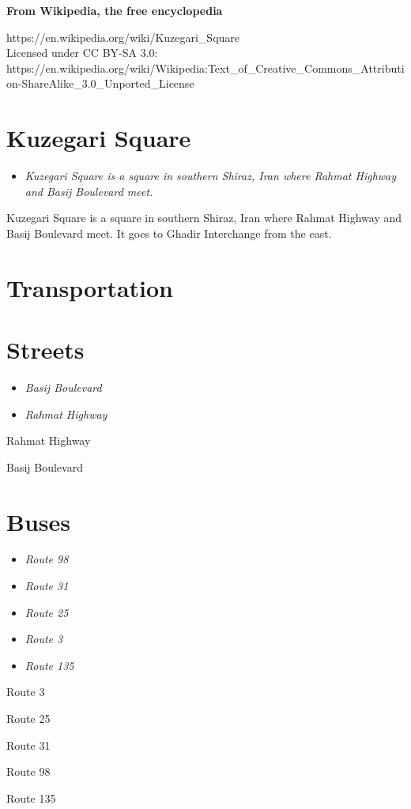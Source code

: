 \textbf{From Wikipedia, the free encyclopedia}

https://en.wikipedia.org/wiki/Kuzegari\_Square\\
Licensed under CC BY-SA 3.0:\\
https://en.wikipedia.org/wiki/Wikipedia:Text\_of\_Creative\_Commons\_Attribution-ShareAlike\_3.0\_Unported\_License

\section{Kuzegari Square}\label{kuzegari-square}

\begin{itemize}
\item
  \emph{Kuzegari Square is a square in southern Shiraz, Iran where
  Rahmat Highway and Basij Boulevard meet.}
\end{itemize}

Kuzegari Square is a square in southern Shiraz, Iran where Rahmat
Highway and Basij Boulevard meet. It goes to Ghadir Interchange from the
east.

\section{Transportation}\label{transportation}

\section{Streets}\label{streets}

\begin{itemize}
\item
  \emph{Basij Boulevard}
\item
  \emph{Rahmat Highway}
\end{itemize}

Rahmat Highway

Basij Boulevard

\section{Buses}\label{buses}

\begin{itemize}
\item
  \emph{Route 98}
\item
  \emph{Route 31}
\item
  \emph{Route 25}
\item
  \emph{Route 3}
\item
  \emph{Route 135}
\end{itemize}

Route 3

Route 25

Route 31

Route 98

Route 135
